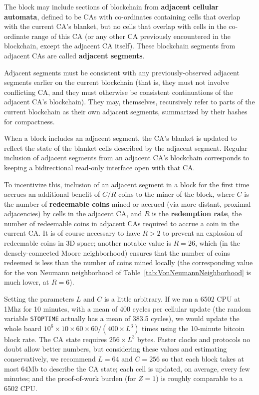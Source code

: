 \documentclass{article}
\begin{document}
The block may include sections of blockchain from {\bf adjacent cellular automata},
defined to be CAs with co-ordinates containing cells that
overlap with the current CA's blanket,
but no cells that overlap with
cells in the co-ordinate range of this CA (or any other CA previously encountered in the blockchain,
except the adjacent CA itself).
These blockchain segments from adjacent CAs are called {\bf adjacent segments}.

Adjacent segments must be consistent with any previously-observed adjacent segments
earlier on the current blockchain (that is, they must not involve conflicting CA,
and they must otherwise be consistent continuations of the adjacent CA's blockchain).
They may, themselves, recursively refer to parts of the current blockchain as their own adjacent segments,
summarized by their hashes for compactness.

When a block includes an adjacent segment, the CA's blanket is updated to reflect the state
of the blanket cells described by the adjacent segment.
Regular inclusion of adjacent segments from an adjacent CA's blockchain
corresponds to keeping a bidirectional read-only interface open with that CA.

To incentivize this,
inclusion of an adjacent segment in a block for the first time
accrues an additional benefit of $C/R$ coins to the miner of the block,
where $C$ is the number of {\bf redeemable coins} mined or accrued (via more distant, proximal adjacencies)
by cells in the adjacent CA,
and $R$ is the {\bf redemption rate}, the number of redeemable coins in adjacent CAs
required to accrue a coin in the current CA.
It is of course necessary to have $R>2$ to prevent an explosion of redeemable coins in 3D space;
another notable value is $R=26$, which (in the densely-connected Moore neighborhood)
ensures that the number of coins redeemed is less than the number of coins mined locally
(the corresponding value for the von Neumann neighborhood of Table~\ref{tab:VonNeumannNeighborhood}
is much lower, at $R=6$).

Setting the parameters $L$ and $C$ is a little arbitrary.
If we ran a 6502 CPU at 1Mhz for 10 minutes, with a mean of 400 cycles per cellular update
(the random variable {\tt STOPTIME} actually has a mean of 383.5 cycles),
we would update the whole board $10^6 \times 10 \times 60 \times 60 / (400 \times L^3)$ times
using the 10-minute bitcoin block rate.
The CA state requires $256 \times L^3$ bytes.
Faster clocks and protocols no doubt allow better numbers,
but considering these values and estimating conservatively,
we recommend $L=64$ and $C=256$ so that each block takes at most 64Mb to describe the CA state;
each cell is updated, on average, every few minutes;
and the proof-of-work burden (for $Z=1$) is roughly comparable to a 6502 CPU.
\end{document}
